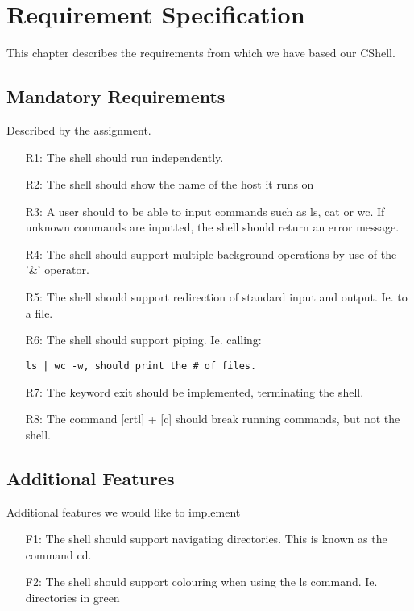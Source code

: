 \chapter{Requirement Specification}
This chapter describes the requirements from which we have based our CShell.

\section{Mandatory Requirements}
Described by the assignment.

\begin{itemize}[leftmargin=25mm]

\item[R1:] The shell should run independently.
\item[R2:] The shell should show the name of the host it runs on
\item[R3:] A user should to be able to input commands such as ls, cat or wc. If unknown commands are inputted, the shell should return an error message.
\item[R4:] The shell should support multiple background operations by use of the '\&' operator.
\item[R5:] The shell should support redirection of standard input and output. Ie. to a file.
\item[R6:] The shell should support piping.
Ie. calling: \begin{verbatim}ls | wc -w, should print the # of files.
\end{verbatim}
\item[R7:] The keyword exit should be implemented, terminating the shell.
\item[R8:] The command [crtl] + [c] should break running commands, but not the shell.

\end{itemize}

\section{Additional Features}
Additional features we would like to implement

\begin{itemize}[leftmargin=25mm]

\item[F1:] The shell should support navigating directories. This is known as the command cd.
\item[F2:] The shell should support colouring when using the ls command. Ie. directories in green

\end{itemize}